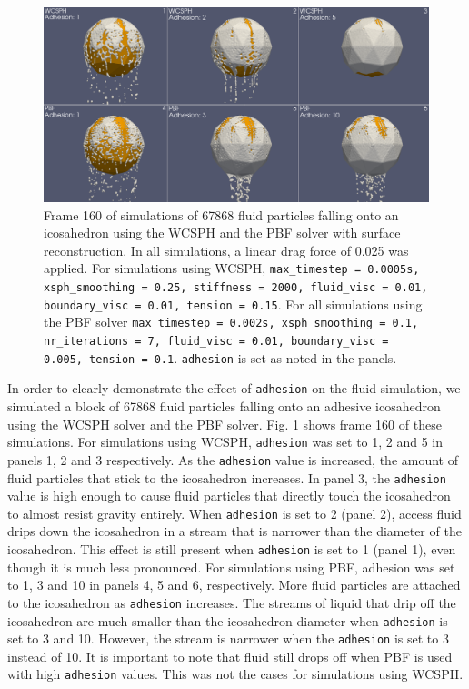 \documentclass[11pt, letterpaper, twocolumn]{article}
\begin{document}
\begin{figure}[!b]
  \centering
  \includegraphics[width=\textwidth]{images/adhesion.0160.png}
  \caption{Frame 160 of simulations of 67868 fluid particles falling onto an icosahedron using the WCSPH and the PBF solver with surface reconstruction. In all simulations, a linear drag force of 0.025 was applied. For simulations using WCSPH, \texttt{max\_timestep = 0.0005s,
  xsph\_smoothing = 0.25, stiffness = 2000, fluid\_visc = 0.01, boundary\_visc = 0.01, tension = 0.15}. For all simulations using the PBF solver \texttt{max\_timestep = 0.002s, xsph\_smoothing = 0.1, nr\_iterations = 7, fluid\_visc = 0.01, boundary\_visc = 0.005, tension = 0.1}. \texttt{adhesion} is set as noted in the panels.}
  \label{fig:adhesion}
\end{figure}

In order to clearly demonstrate the effect of \texttt{adhesion} on the fluid simulation, we simulated a block of 67868 fluid particles falling onto an adhesive icosahedron using the WCSPH solver and the PBF solver. Fig. \ref{fig:adhesion} shows frame 160 of these simulations. For simulations using WCSPH, \texttt{adhesion} was set to 1, 2 and 5 in panels 1, 2 and 3 respectively. As the 
\texttt{adhesion} value is increased, the amount of fluid particles that stick to the icosahedron increases. In panel 3, the \texttt{adhesion} value is high enough to cause fluid particles that directly touch the icosahedron to almost resist gravity entirely. When \texttt{adhesion} is set to 2 (panel 2), access fluid drips down the icosahedron in a stream
that is narrower than the diameter of the icosahedron. This effect is still present when \texttt{adhesion} is set to 1 (panel 1), even though it is much less pronounced. For simulations using PBF, adhesion was set to 1, 3 and 10 in panels 4, 5 and 6, respectively.
More fluid particles are attached to the icosahedron as \texttt{adhesion} increases.
The streams of liquid that drip off the icosahedron are much smaller than the icosahedron diameter when \texttt{adhesion} is set to 3 and 10. However, the stream is narrower when the \texttt{adhesion} is set to 3 instead of 10. It is important to note that fluid still drops off when PBF is used with high  \texttt{adhesion} values.
This was not the cases for simulations using WCSPH. 
\end{document}
